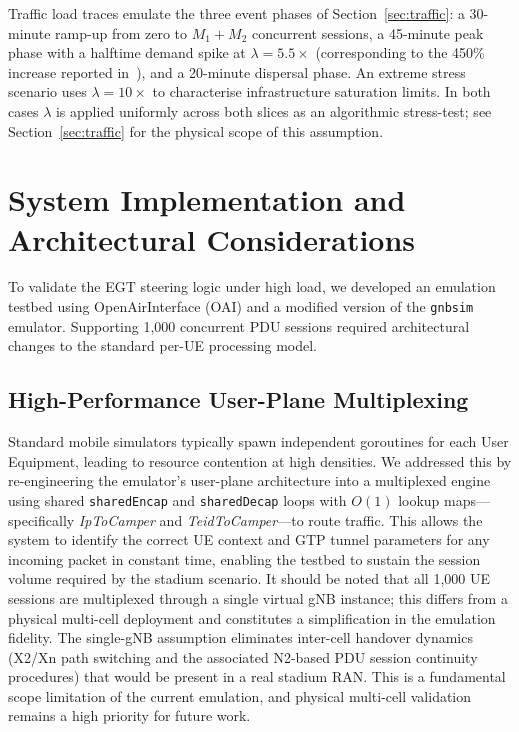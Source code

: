 \documentclass[conference]{IEEEtran}
\begin{document}
Traffic load traces emulate the three event phases of
Section~\ref{sec:traffic}: a 30-minute ramp-up from zero
to $M_1 + M_2$ concurrent sessions, a 45-minute peak
phase with a halftime demand spike at $\lambda = 5.5\times$
(corresponding to the 450\% increase reported
in~\cite{superbowl_lvii}), and a 20-minute dispersal
phase. An extreme stress scenario uses $\lambda = 10\times$
to characterise infrastructure saturation limits.
In both cases $\lambda$ is applied uniformly across both
slices as an algorithmic stress-test; see
Section~\ref{sec:traffic} for the physical scope of this
assumption.

\section{System Implementation and Architectural Considerations}
\label{sec:implementation}

To validate the EGT steering logic under high load, we
developed an emulation testbed using OpenAirInterface
(OAI) and a modified version of the \texttt{gnbsim}
emulator. Supporting 1,000 concurrent PDU sessions
required architectural changes to the standard
per-UE processing model.

\subsection{High-Performance User-Plane Multiplexing}

Standard mobile simulators typically spawn independent
goroutines for each User Equipment, leading to resource
contention at high densities. We addressed this by
re-engineering the emulator's user-plane architecture
into a multiplexed engine using shared
\texttt{sharedEncap} and \texttt{sharedDecap} loops with
$O(1)$ lookup maps---specifically \textit{IpToCamper}
and \textit{TeidToCamper}---to route traffic. This
allows the system to identify the correct UE context
and GTP tunnel parameters for any incoming packet in
constant time, enabling the testbed to sustain the
session volume required by the stadium scenario.
It should be noted that all 1,000 UE sessions are
multiplexed through a single virtual gNB instance;
this differs from a physical multi-cell deployment and
constitutes a simplification in the emulation fidelity.
The single-gNB assumption eliminates inter-cell handover
dynamics (X2/Xn path switching and the associated N2-based
PDU session continuity procedures) that would be present
in a real stadium RAN. This is a fundamental scope
limitation of the current emulation, and physical
multi-cell validation remains a high priority for
future work.
\end{document}
